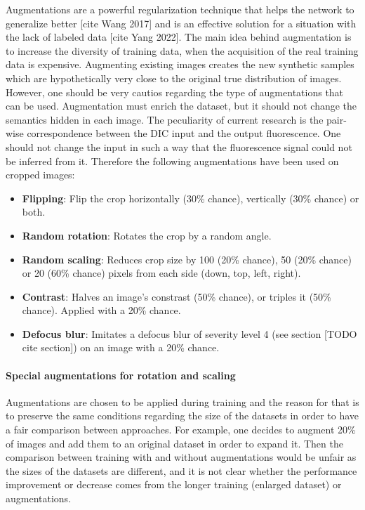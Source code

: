 Augmentations are a powerful regularization technique that helps the network to generalize better [cite Wang 2017] and is an effective solution for a situation with the lack of labeled data [cite Yang 2022]. The main idea behind augmentation is to increase the diversity of training data, when the acquisition of the real training data is expensive. Augmenting existing images creates the new synthetic samples which are hypothetically very close to the original true distribution of images. However, one should be very cautios regarding the type of augmentations that can be used. Augmentation must enrich the dataset, but it should not change the semantics hidden in each image. The peculiarity of current research is the pair-wise correspondence between the DIC input and the output fluorescence. One should not change the input in such a way that the fluorescence signal could not be inferred from it. Therefore the following augmentations have been used on cropped images:

\begin{itemize}
	\item \textbf{Flipping}: Flip the crop horizontally (30\% chance), vertically (30\% chance) or both.
	\item \textbf{Random rotation}: Rotates the crop by a random angle.
	\item \textbf{Random scaling}: Reduces crop size by 100 (20\% chance), 50 (20\% chance) or 20 (60\% chance) pixels from each side (down, top, left, right).
	\item \textbf{Contrast}: Halves an image's constrast (50\% chance), or triples it (50\% chance). Applied with a 20\% chance.
	\item \textbf{Defocus blur}: Imitates a defocus blur of severity level 4 (see section [TODO cite section]) on an image with a 20\% chance.
\end{itemize}

\paragraph{Special augmentations for rotation and scaling}

Augmentations are chosen to be applied during training and the reason for that is to preserve the same conditions regarding the size of the datasets in order to have a fair comparison between approaches. For example, one decides to augment 20\% of images and add them to an original dataset in order to expand it. Then the comparison between training with and without augmentations would be unfair as the sizes of the datasets are different, and it is not clear whether the performance improvement or decrease comes from the longer training (enlarged dataset) or augmentations.

